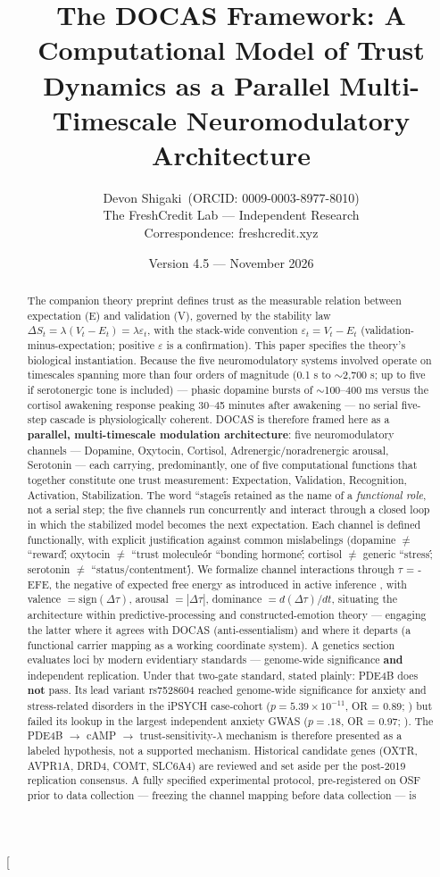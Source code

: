 \documentclass[11pt,twocolumn]{article}
\title{The DOCAS Framework: A Computational Model of Trust Dynamics as a Parallel Multi-Timescale Neuromodulatory Architecture}
\author{Devon Shigaki~(ORCID: 0009-0003-8977-8010)\\
\small The FreshCredit Lab --- Independent Research\\
\small Correspondence: freshcredit.xyz}
\date{\small Version 4.5 --- November 2026}
\theoremstyle{plain}
\begin{document}
\twocolumn[{%
\maketitle
\begin{abstract}
The companion theory preprint defines trust as the measurable relation between expectation (E) and validation (V), governed by the stability law $\Delta S_t = \lambda(V_t - E_t) = \lambda\varepsilon_t$, with the stack-wide convention $\varepsilon_t = V_t - E_t$ (validation-minus-expectation; positive $\varepsilon$ is a confirmation). This paper specifies the theory's biological instantiation. Because the five neuromodulatory systems involved operate on timescales spanning more than four orders of magnitude (0.1 s to $\sim$2,700 s; up to five if serotonergic tone is included) — phasic dopamine bursts of $\sim$100–400 ms versus the cortisol awakening response peaking 30–45 minutes after awakening — no serial five-step cascade is physiologically coherent. DOCAS is therefore framed here as a \textbf{parallel, multi-timescale modulation architecture}: five neuromodulatory channels — Dopamine, Oxytocin, Cortisol, Adrenergic/noradrenergic arousal, Serotonin — each carrying, predominantly, one of five computational functions that together constitute one trust measurement: Expectation, Validation, Recognition, Activation, Stabilization. The word ``stage\'\' is retained as the name of a \textit{functional role}, not a serial step; the five channels run concurrently and interact through a closed loop in which the stabilized model becomes the next expectation. Each channel is defined functionally, with explicit justification against common mislabelings (dopamine $\neq$ ``reward\'\'; oxytocin $\neq$ ``trust molecule\'\' or ``bonding hormone\'\'; cortisol $\neq$ generic ``stress\'\'; serotonin $\neq$ ``status/contentment\'\'). We formalize channel interactions through $\tau$ = -EFE, the negative of expected free energy as introduced in active inference \citep{friston2015,friston2017}, with valence $= \mathrm{sign}(\Delta\tau)$, arousal $= |\Delta\tau|$, dominance $= d(\Delta\tau)/dt$, situating the architecture within predictive-processing and constructed-emotion theory — engaging the latter where it agrees with DOCAS (anti-essentialism) and where it departs (a functional carrier mapping as a working coordinate system). A genetics section evaluates loci by modern evidentiary standards — genome-wide significance \textbf{and} independent replication. Under that two-gate standard, stated plainly: PDE4B does \textbf{not} pass. Its lead variant rs7528604 reached genome-wide significance for anxiety and stress-related disorders in the iPSYCH case-cohort ($p = 5.39 \times 10^{-11}$, OR = 0.89; \citealp{meier2019}) but failed its lookup in the largest independent anxiety GWAS ($p = .18$, OR = 0.97; \citealp{purves2020}). The PDE4B $\to$ cAMP $\to$ trust-sensitivity-$\lambda$ mechanism is therefore presented as a labeled hypothesis, not a supported mechanism. Historical candidate genes (OXTR, AVPR1A, DRD4, COMT, SLC6A4) are reviewed and set aside per the post-2019 replication consensus. A fully specified experimental protocol, pre-registered on OSF prior to data collection — freezing the channel mapping before data collection — is 
\end{abstract}}
\end{document}
